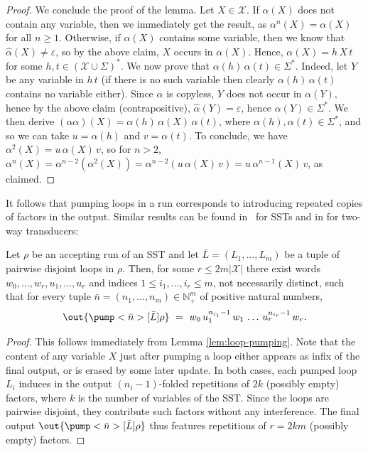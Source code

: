 \documentclass{article}
\newcommand{\var}{\mathcal{X}}
\begin{document}
\begin{proof}
      We conclude the proof of the lemma. Let $X\in \var$. 
      If $\alpha(X)$ does not contain any variable, then
      we immediately get the result, as
      $\alpha^n(X) = \alpha(X)$ for all $n\geq 1$. 
      Otherwise, if $\alpha(X)$ contains some variable, then
      we know that $\hat\alpha(X)\neq\varepsilon$, 
      so by the above claim, $X$ occurs in $\alpha(X)$. 
      Hence, $\alpha(X) = h \, X \,t$ 
      for some $h,t\in(\var\cup\Sigma)^*$. 
      We now prove that
      $\alpha(h)\, \alpha(t)\in\Sigma^*$. 
      Indeed, let $Y$ be any variable in $h\,t$ 
      (if there is no such variable then clearly 
       $\alpha(h)\, \alpha(t)$ contains no variable either). 
      Since $\alpha$ is copyless, 
      $Y$ does not occur in $\alpha(Y)$, 
      hence by the above claim (contrapositive), 
      $\hat\alpha(Y)=\varepsilon$,
      hence $\alpha(Y)\in\Sigma^*$. 
      We then derive
      $(\alpha\alpha)(X) = \alpha(h) \, \alpha(X) \, \alpha(t)$,
      where $\alpha(h),\alpha(t)\in\Sigma^*$, and so we can take 
      $u = \alpha(h)$ and $v=\alpha(t)$. 
      To conclude, we have 
      $\alpha^2(X) = u \, \alpha(X) \,v$, so for $n>2$, 
      $\alpha^n(X) = \alpha^{n-2}(\alpha^2(X)) = 
       \alpha^{n-2}(u \, \alpha(X) \,v) = u \, \alpha^{n-1}(X) \,v$,
      as claimed. 
\end{proof}



It follows that pumping loops in a run corresponds 
to introducing repeated copies of factors in the output. 
Similar results can be found
in~\cite{equivalence-finite-valued} for SSTs 
and in \cite{rozoy1986,GaetanPhD} for two-way transducers:


\begin{corollary}\label{cor:loop-pumping}
Let $\rho$ be an accepting run of an SST and let $\bar L = (L_1,\dots,L_m)$ 
be a tuple of pairwise disjoint loops in $\rho$.
Then, for some $r \le 2m|\var|$ there exist words $w_0,\dots,w_r,u_1,\dots,u_r$ 
and indices $1\le i_1,\dots,i_r\le m$, not necessarily distinct, such that 
for every tuple $\bar n = (n_1,\dots,n_m) \in \mathbb{N}^m_+$ of positive natural numbers, 
\[
  \out{\pump<\bar n>[\bar L]{\rho}}
  ~=~
  w_0 \, u_1^{n_{i_1}-1} \, w_1 \, \dots \, u_r^{n_{i_r}-1} \, w_r.
\]
\end{corollary}

\begin{proof}
This follows immediately from Lemma \ref{lem:loop-pumping}.
Note that the content of any variable $X$ just after
pumping a loop either appears as infix of the final output, 
or is erased by some later update. 
In both cases, each pumped loop $L_i$ induces in the output 
$(n_i-1)$-folded repetitions of $2k$ (possibly empty) factors, 
where $k$ is the number of variables of the SST.
Since the loops are pairwise disjoint, they contribute such factors
without any interference.
The final output $\out{\pump<\bar n>[\bar L]{\rho}}$ 
thus features repetitions of $r = 2km$ (possibly empty) factors.
\end{proof}
\end{document}
